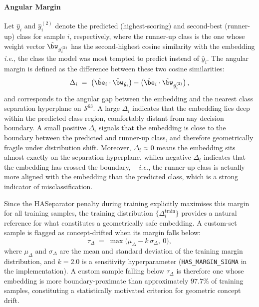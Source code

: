 \paragraph{Angular Margin}

Let $\hat{y}_i$ and $\hat{y}_i^{(2)}$ denote the predicted
(highest-scoring) and second-best (runner-up) class for sample
$i$, respectively, where the runner-up class is the one whose
weight vector $\hat{\bw}_{\hat{y}_i^{(2)}}$ has the second-highest
cosine similarity with the embedding \textit {i.e.}, the class the model
was most tempted to predict instead of $\hat{y}_i$.
The angular margin is defined as the difference between these two
cosine similarities:
\begin{equation}
  \Delta_i \;=\;
    \bigl(\hat{\be}_i \cdot \hat{\bw}_{\hat{y}_i}\bigr) -
    \bigl(\hat{\be}_i \cdot \hat{\bw}_{\hat{y}_i^{(2)}}\bigr)\,,
  \label{eq:margin}
\end{equation}
and corresponds to the angular gap between the embedding and the
nearest class separation hyperplane on $\mathcal{S}^{63}$.
A large $\Delta_i$ indicates that the embedding lies deep within
the predicted class region, comfortably distant from any decision
boundary.
A small positive $\Delta_i$ signals that the embedding is close to the boundary between the predicted and runner-up class, and therefore geometrically fragile under distribution
shift.
Moreover, $\Delta_i \approx 0$ means the embedding sits almost
exactly on the separation hyperplane, whilea negative $\Delta_i$
indicates that the embedding has crossed the boundary, ~\textit{ i.e.}, the
runner-up class is actually more aligned with the embedding than
the predicted class, which is a strong indicator of
misclassification.

Since the HASeparator penalty during training explicitly maximises
this margin for all training samples, the training distribution
$\{\Delta_i^{\mathrm{train}}\}$ provides a natural reference for
what constitutes a geometrically safe embedding.
A custom-set sample is flagged as concept-drifted when its margin falls below:
\begin{equation}
  \tau_\Delta \;=\; \max\!\bigl(\mu_\Delta - k\,\sigma_\Delta,\ 0\bigr),
  \label{eq:margin_thresh}
\end{equation}
where $\mu_\Delta$ and $\sigma_\Delta$ are the mean and standard
deviation of the training margin distribution, and $k = 2.0$
is a sensitivity hyperparameter (\texttt{HAS\_MARGIN\_SIGMA}
in the implementation). A custom sample falling below
$\tau_\Delta$ is therefore one whose embedding is more
boundary-proximate than approximately $97.7\%$ of training
samples, constituting a statistically motivated criterion for
geometric concept drift.



